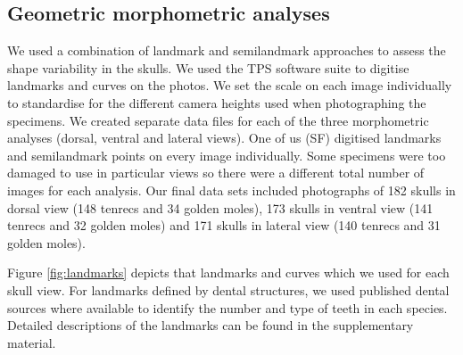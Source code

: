 \documentclass[12pt,a4paper]{article}
\begin{document}
\subsection{Geometric morphometric analyses}

	We used a combination of landmark and semilandmark approaches to assess the shape variability in the skulls.  We used the TPS software suite \citep{Rohlf2013} to digitise landmarks and curves on the photos. We set the scale on each image individually to standardise for the different camera heights used when photographing the specimens. We created separate data files for each of the three morphometric analyses (dorsal, ventral and lateral views). One of us (SF) digitised landmarks and semilandmark points on every image individually. Some specimens were too damaged to use in particular views so there were a different total number of images for each analysis. Our final data sets included photographs of 182 skulls in dorsal view (148 tenrecs and 34 golden moles), 173 skulls in ventral view (141 tenrecs and 32 golden moles) and 171 skulls in lateral view (140 tenrecs and 31 golden moles).

	Figure \ref{fig:landmarks} depicts that landmarks and curves which we used for each skull view. For landmarks defined by dental structures, we used published dental sources \citep{Repenning1967, Eisenberg1969, Nowak1983, MacPhee1987, KnoxJones1992, Davis1997, Querouil2001, Nagorsen2002, Wilson2005, Goodman2006, Karatas2007, Hoffmann2008, Asher2008,  Muldoon2009, Lin2010} where available to identify the number and type of teeth in each species. Detailed descriptions of the landmarks can be found in the supplementary material.
	
\end{document}
